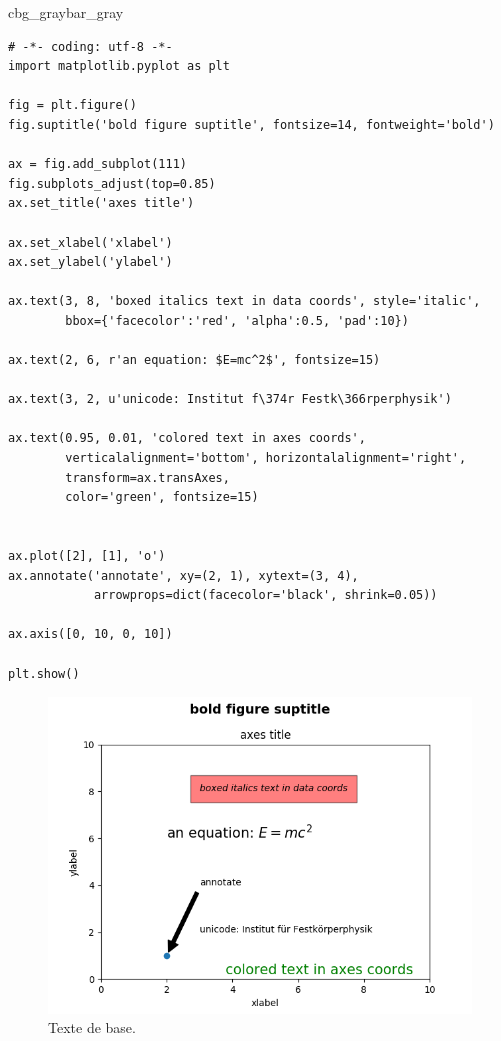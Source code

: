 \documentclass[%
oneside,                 %
final,                   %
10pt,french]{article}
\newenvironment{_pro_tight}[2]{
   \def\FrameCommand{\color{#2}\vrule width 1mm\normalcolor\colorbox{#1}}
   \FrameRule0.6pt\MakeFramed {\advance\hsize-2mm\FrameRestore}\vskip3mm}
   {\vskip0mm\endMakeFramed}
\newenvironment{pro}[2]{
\bgroup\rmfamily
\fboxsep=0mm\relax
\begin{_pro_tight}{#1}{#2}
\list{}{\parsep=-2mm\parskip=0mm\topsep=0pt\leftmargin=2mm
\rightmargin=2\leftmargin\leftmargin=4pt\relax}
\item\relax}
{\endlist\end{_pro_tight}\egroup}
\begin{document}
\begin{pro}{cbg_gray}{bar_gray}\begin{verbatim}
# -*- coding: utf-8 -*-
import matplotlib.pyplot as plt

fig = plt.figure()
fig.suptitle('bold figure suptitle', fontsize=14, fontweight='bold')

ax = fig.add_subplot(111)
fig.subplots_adjust(top=0.85)
ax.set_title('axes title')

ax.set_xlabel('xlabel')
ax.set_ylabel('ylabel')

ax.text(3, 8, 'boxed italics text in data coords', style='italic',
        bbox={'facecolor':'red', 'alpha':0.5, 'pad':10})

ax.text(2, 6, r'an equation: $E=mc^2$', fontsize=15)

ax.text(3, 2, u'unicode: Institut f\374r Festk\366rperphysik')

ax.text(0.95, 0.01, 'colored text in axes coords',
        verticalalignment='bottom', horizontalalignment='right',
        transform=ax.transAxes,
        color='green', fontsize=15)


ax.plot([2], [1], 'o')
ax.annotate('annotate', xy=(2, 1), xytext=(3, 4),
            arrowprops=dict(facecolor='black', shrink=0.05))

ax.axis([0, 10, 0, 10])

plt.show()
\end{verbatim}
\end{pro}
\noindent


\begin{figure}[!ht]  %
  \centerline{\includegraphics[width=0.7\linewidth]{imgs/BasicText.png}}
  \caption{
  Texte de base. \label{fig:BasicText}
  }
\end{figure}
\end{document}
